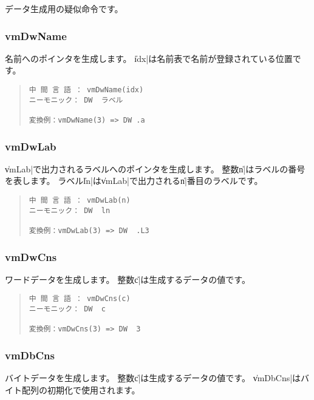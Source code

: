 データ生成用の疑似命令です。

\subsubsection{vmDwName}

名前へのポインタを生成します。
\|idx|は名前表で名前が登録されている位置です。

\begin{quote}
\begin{verbatim}
中 間 言 語 ： vmDwName(idx)
ニーモニック： DW  ラベル

変換例：vmDwName(3) => DW .a
\end{verbatim}
\end{quote}

\subsubsection{vmDwLab}

\|vmLab|で出力されるラベルへのポインタを生成します。
整数\|n|はラベルの番号を表します。
ラベル\|ln|は\|vmLab|で出力される\|n|番目のラベルです。

\begin{quote}
\begin{verbatim}
中 間 言 語 ： vmDwLab(n)
ニーモニック： DW  ln   

変換例：vmDwLab(3) => DW  .L3
\end{verbatim}
\end{quote}

\subsubsection{vmDwCns}

ワードデータを生成します。
整数\|c|は生成するデータの値です。

\begin{quote}
\begin{verbatim}
中 間 言 語 ： vmDwCns(c)
ニーモニック： DW  c   

変換例：vmDwCns(3) => DW  3
\end{verbatim}
\end{quote}

\subsubsection{vmDbCns}

バイトデータを生成します。
整数\|c|は生成するデータの値です。
\|vmDbCns|はバイト配列の初期化で使用されます。

